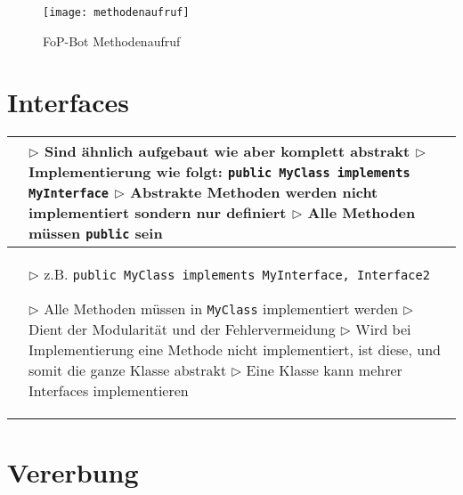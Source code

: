 	
	\begin{figure}[H]
		\centering
		\texttt{[image: methodenaufruf]}
		\caption{FoP-Bot Methodenaufruf}
	\end{figure}
	


\section{Interfaces}


	\begin{table}[H]
	\label{Interfaces}
	\begin{tabular}{ | p{4cm} p{13.5cm} | }


	\hline
	\makecell[l]{Struktur} & 
	\makecell[l]
	{
	$\rhd$ Sind ähnlich aufgebaut wie \underline{\nameref{Klassen}} 
	aber komplett abstrakt \\
	$\rhd$ Implementierung wie folgt: \texttt{public MyClass implements 
	MyInterface} \\
	$\rhd$ Abstrakte Methoden werden nicht implementiert sondern nur 
	definiert \\
	$\rhd$ Alle Methoden müssen \texttt{public} sein \\
	} 	\\ \hline
	
	\makecell[l]{Funktion} & 
	\makecell[l]
	{
	$\rhd$ z.B. \texttt{public MyClass implements MyInterface, Interface2} 
	\\
	$\rhd$ Alle Methoden müssen in \texttt{MyClass} implementiert 
	werden \\
	$\rhd$ Dient der Modularität und der Fehlervermeidung \\
	$\rhd$ Wird bei Implementierung eine Methode nicht implementiert, ist 
	diese, \\
	\hspace{0.5cm} und somit die ganze Klasse abstrakt \\
	$\rhd$ Eine Klasse kann mehrer Interfaces implementieren
	} 	\\ \hline

	
	\end{tabular}
	\end{table}
	


\section{Vererbung}


